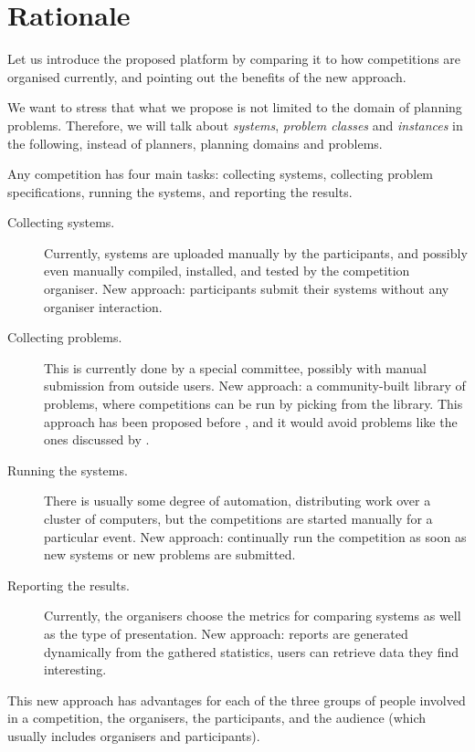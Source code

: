 \section{Rationale}
\label{sec:rationale}

Let us introduce the proposed platform by comparing it to how competitions are organised currently, and pointing out the benefits of the new approach.

We want to stress that what we propose is not limited to the domain of planning problems. Therefore, we will talk about \emph{systems}, \emph{problem classes} and \emph{instances} in the following, instead of planners, planning domains and problems.

Any competition has four main tasks: collecting systems, collecting problem specifications, running the systems, and reporting the results.

\begin{description}
  \item[Collecting systems.] Currently, systems are uploaded manually by the participants, and possibly even manually compiled, installed, and tested by the competition organiser. New approach: participants submit their systems without any organiser interaction.
  \item[Collecting problems.] This is currently done by a special committee, possibly with manual submission from outside users. New approach: a community-built library of problems, where competitions can be run by picking from the library. This approach has been proposed before \cite{ToughNuts}, and it would avoid problems like the ones discussed by \cite{pg2008002}.
  \item[Running the systems.] There is usually some degree of automation, distributing work over a cluster of computers, but the competitions are started manually for a particular event. New approach: continually run the competition as soon as new systems or new problems are submitted.
  \item[Reporting the results.] Currently, the organisers choose the metrics for comparing systems as well as the type of presentation. New approach: reports are generated dynamically from the gathered statistics, users can retrieve data they find interesting.
\end{description}

This new approach has advantages for each of the three groups of people involved in a competition, the organisers, the participants, and the audience (which usually includes organisers and participants).

